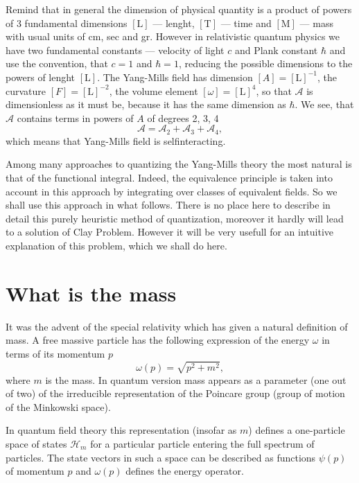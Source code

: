 \documentclass[12pt]{article}
\newcommand{\AAA}{\mathcal{A}}
\newcommand{\HH} {\mathcal{H}}
\newcommand{\Lenght}{\text{L}}
\newcommand{\Mass}{\text{M}}
\newcommand{\Time}{\text{T}}
\begin{document}
	Remind that in general the dimension of physical quantity
	is a product of powers of 3 fundamental dimensions
    $ [ \Lenght ] $ ---
	lenght,
    $ [ \Time ] $ ---
	time and
    $ [ \Mass ] $ ---
	mass with usual units of cm, sec and gr. However in
	relativistic quantum physics we have two fundamental constants ---
	velocity of light
    $ c $
	and Plank constant
    $ \hbar $
	and use the convention, that
    $ c = 1 $ and
    $ \hbar = 1 $,
	reducing the possible dimensions to the powers of lenght
    $ [ \Lenght ] $.
	The Yang-Mills field has dimension
    $ [ A ] = [ \Lenght ]^{-1} $,
	the curvature
    $ [ F ] = [ \Lenght ]^{-2} $,
	the volume element
    $ [ \omega ] = [ \Lenght ]^{4} $,
	so that
    $ \AAA $
	is dimensionless as it must be, because it has the same dimension
	as
    $ \hbar $.
	We see, that
    $ \AAA $
	contains terms in powers of
    $ A $
	of degrees 2, 3, 4
\begin{equation*}
        \AAA = \AAA_{2} + \AAA_{3} + \AAA_{4} ,
\end{equation*}
	which means that Yang-Mills field is selfinteracting.

	Among many approaches to quantizing the Yang-Mills theory
	the most natural is that of the functional integral. 
	Indeed, the equivalence principle is taken into account in
	this approach by integrating over classes of equivalent
	fields. 
	So we shall use this approach in what follows.
	There is no place here to describe in detail this purely
	heuristic method
	of quantization, moreover it hardly will lead to a solution
	of Clay Problem. 
	However it will be very usefull for an intuitive explanation
	of this problem, which we shall do here.

\section{What is the mass}
	It was the advent of the special relativity which has given a
	natural definition of mass. A free massive particle has 
	the following expression of the energy
    $ \omega $
	in terms of its momentum
    $ p $
\begin{equation*}
	\omega(p) = \sqrt{p^{2} + m^{2}} ,
\end{equation*}
	where
    $ m $
	is the mass.
	In quantum version mass appears as a parameter (one out of two)
	of the irreducible representation of the Poincare group
	(group of motion of the Minkowski space).

	In quantum field theory this representation 
	(insofar as
    $ m $) 
	defines a one-particle space of states
    $ \HH_{m} $
	for a particular particle entering the full spectrum of particles.
	The state vectors in such a space can be described as
	functions
    $ \psi(p) $
	of momentum
    $ p $
	and
    $ \omega(p) $
	defines the energy operator.
\end{document}
